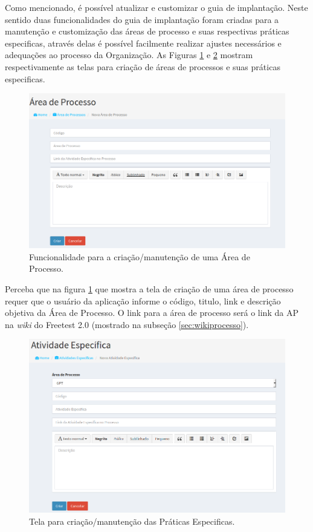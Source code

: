 Como mencionado, é possível atualizar e customizar o guia de implantação. Neste sentido duas funcionalidades do guia de implantação foram criadas para a manutenção e customização das áreas de processo e suas respectivas práticas especificas, através delas é possível facilmente realizar ajustes necessários e adequações ao processo da Organização. As Figuras \ref{fig:fig69} e \ref{fig:fig610} mostram respectivamente as telas para criação de áreas de processos e suas práticas especificas.

\begin{figure}[H]
\centering
\includegraphics[width=.90\textwidth]{fig/figura69.png}
\caption{Funcionalidade para a criação/manutenção de uma Área de Processo.}
\label{fig:fig69}
\end{figure}

Perceba que na figura \ref{fig:fig69} que mostra a tela de criação de uma área de processo requer que o usuário da aplicação informe o código, titulo, link e descrição objetiva da Área de Processo. O link para a área de processo será o link da AP na \textit{wiki} do Freetest 2.0 (mostrado na subseção \ref{sec:wikiprocesso}).

\begin{figure}[H]
\centering
\includegraphics[width=.90\textwidth]{fig/figura610.png}
\caption{Tela para criação/manutenção das Práticas Especificas.}
\label{fig:fig610}
\end{figure}

